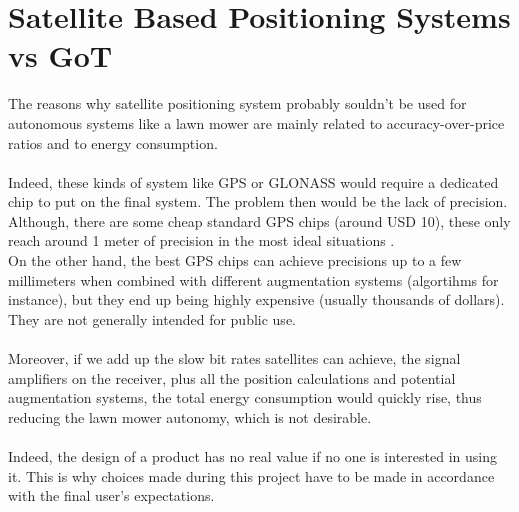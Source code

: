 \section{Satellite Based Positioning Systems vs GoT}
The reasons why satellite positioning system probably souldn't be used for autonomous systems like a lawn mower are mainly related to accuracy-over-price ratios and to energy consumption.\\\\
%
Indeed, these kinds of system like GPS or GLONASS would require a dedicated chip to put on the final system. The problem then would be the lack of precision. Although, there are some cheap standard GPS chips (around USD 10), these only reach around 1 meter of precision in the most ideal situations \cite{GPSUSWebsiteAccuracy,Miller}. \\
On the other hand, the best GPS chips can achieve precisions up to a few millimeters \cite{GPSUSWebsiteAccuracy} when combined with different augmentation systems (algortihms for instance), but they end up being highly expensive (usually thousands of dollars). They are not generally intended for public use.\\\\
%
Moreover, if we add up the slow bit rates satellites can achieve, the signal amplifiers on the receiver, plus all the position calculations and potential augmentation systems, the total energy consumption would quickly rise, thus reducing the lawn mower autonomy, which is not desirable.\\\\
%
Indeed, the design of a product has no real value if no one is interested in using it. This is why choices made during this project have to be made in accordance with the final user's expectations.